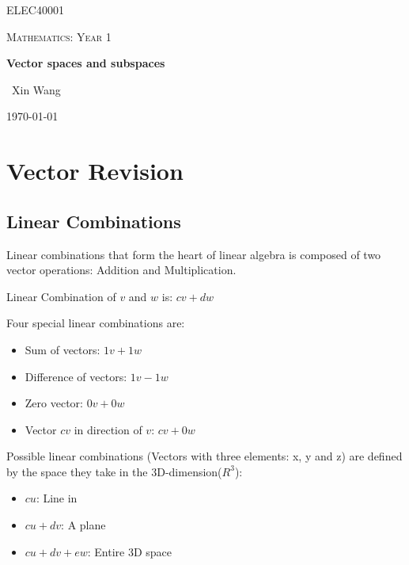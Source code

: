 \documentclass[10pt,a4paper]{article}
\begin{document}
\begin{titlepage}
	\centering
	{\scshape\LARGE ELEC40001 \par}
	\vspace{1cm}
	{\scshape\Large Mathematics: Year 1 \par}
	\vspace{1.5cm}
	{\huge\bfseries Vector spaces and subspaces\par}
	\vspace{2cm}
	{\Large\ Xin Wang }
	\vfill
	{\large \today\par}
\end{titlepage}
\begin{abstract}
	Dealing with 'Square Matrices' is easy but it is not always square and some have 0's in the
	pivot positions. \par 
	This section leads with 'Vector Spaces and Subspaces' and following by solving $Ax=b$ for all cases.
\end{abstract}

\tableofcontents
\pagebreak

\section{Vector Revision}
\subsection{Linear Combinations}
Linear combinations that form the heart of linear algebra is composed of two vector operations: Addition and Multiplication.
\par \begin{center}
	Linear Combination of $v$ and $w$ is: $cv+dw$
\end{center}
Four special linear combinations are:
\begin{itemize}
	\item Sum of vectors: $1v+1w$
	\item Difference of vectors: $1v-1w$
	\item Zero vector: $0v + 0w$
	\item Vector $cv$ in direction of $v$: $cv+0w$
\end{itemize}
Possible linear combinations (Vectors with three elements: x, y and z) are defined by the
space they take in the 3D-dimension($R^3$):
\begin{itemize}
	\item $cu$: Line in 
	\item $cu+dv$: A plane 
	\item $cu+dv+ew$: Entire 3D space
\end{itemize}
\end{document}
